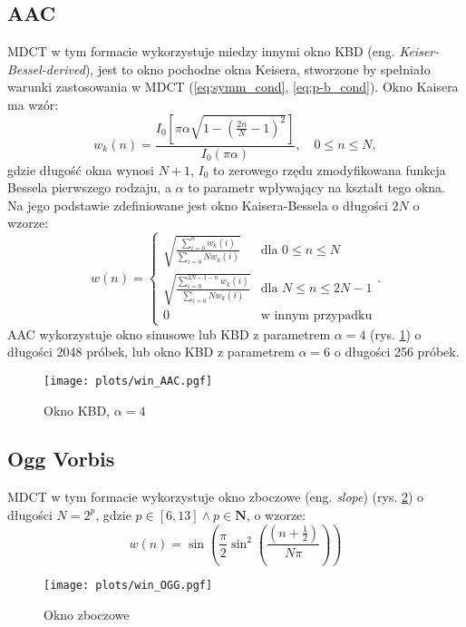 \documentclass[pl,12pt]{aghdpl}
\let\Oldsubsection\subsection%
\renewcommand{\subsection}{\FloatBarrier\Oldsubsection}
\begin{document}
\subsection{AAC}

MDCT w tym formacie wykorzystuje miedzy innymi okno KBD (eng.
\textit{Keiser-Bessel-derived}), jest to okno pochodne okna Keisera, stworzone
by spełniało warunki zastosowania w MDCT (\ref{eq:symm_cond},
\ref{eq:p-b_cond}). Okno Kaisera ma wzór:
\begin{equation}\label{eq:kaiser_win}
  w_k(n) = \frac{I_0\left[\pi\alpha\sqrt{1-\left(\frac{2n}{N}-1\right)^2}\right]}
  {I_0(\pi\alpha)},\quad 0 \leq n \leq N,
\end{equation}
gdzie długość okna wynosi $N+1$, $I_0$ to zerowego rzędu zmodyfikowana funkcja
Bessela pierwszego rodzaju, a $\alpha$ to parametr wpływający na kształt tego
okna. Na jego podstawie zdefiniowane jest okno Kaisera-Bessela o długości $2N$
o wzorze:
\begin{equation}\label{eq:kbd_win}
  w(n) = \begin{cases}
    \sqrt{\frac{\sum_{i=0}^{n}w_k(i)}{\sum_{i=0}{N}w_k(i)}} & \text{dla }0 \leq n \leq N \\
    \sqrt{\frac{\sum_{i=0}^{2N-1-n}w_k(i)}{\sum_{i=0}{N}w_k(i)}} & \text{dla }N \leq n \leq 2N-1 \\
    0 & \text{w innym przypadku}
  \end{cases}.
\end{equation}
AAC wykorzystuje okno sinusowe lub KBD z parametrem $\alpha = 4$ (rys.
\ref{fig:win_AAC}) o długości 2048 próbek, lub okno KBD z parametrem $\alpha =
6$ o długości 256 próbek.

\begin{figure}[!tbh]
  \centering
  \texttt{[image: plots/win\_AAC.pgf]}
  \caption{Okno KBD, $\alpha = 4$}
  \label{fig:win_AAC}
\end{figure}

\subsection{Ogg Vorbis}

MDCT w tym formacie wykorzystuje okno zboczowe (eng. \textit{slope}) (rys.
\ref{fig:win_OGG}) o długości $N = 2^{p}$, gdzie $p \in [6,13] \land p \in \bm N$, o wzorze:
\begin{equation}\label{eq:slope_win}
  w(n) = \sin\left(\frac{\pi}{2}\sin^2\left(\frac{\left(n +
  \frac{1}{2}\right)}{N\pi}\right)\right)
\end{equation}
\begin{figure}[!tbh]
  \centering
  \texttt{[image: plots/win\_OGG.pgf]}
  \caption{Okno zboczowe}
  \label{fig:win_OGG}
\end{figure}
\end{document}
